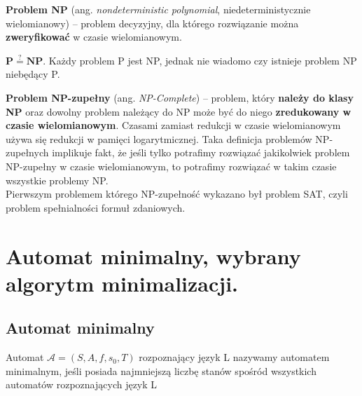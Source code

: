 \documentclass[12pt]{article}
\begin{document}
    \begin{definition}
        \textbf{Problem NP} (ang. \textit{nondeterministic polynomial}, niedeterministycznie wielomianowy) – problem
        decyzyjny, dla którego rozwiązanie można \textbf{zweryfikować} w czasie wielomianowym.
    \end{definition}

    \begin{theorem}
        $\mathbf{P \stackrel{?}{=} NP}$. Każdy problem P jest NP, jednak nie wiadomo czy istnieje problem NP niebędący P.
    \end{theorem}

    \begin{definition}
        \textbf{Problem NP-zupełny} (ang. \textit{NP-Complete}) – problem, który \textbf{należy do klasy NP} oraz dowolny
        problem należący do NP może być do niego \textbf{zredukowany w czasie wielomianowym}. Czasami zamiast redukcji w
        czasie wielomianowym używa się redukcji w pamięci logarytmicznej. Taka definicja problemów NP-zupełnych
        implikuje fakt, że jeśli tylko potrafimy rozwiązać jakikolwiek problem NP-zupełny w czasie wielomianowym,
        to potrafimy rozwiązać w takim czasie wszystkie problemy NP.\\

        Pierwszym problemem którego NP-zupełność wykazano był problem SAT, czyli problem spełnialności formuł zdaniowych.
    \end{definition}

    \newpage

    \section{Automat minimalny, wybrany algorytm minimalizacji.}
    \subsection{Automat minimalny}
    \begin{definition}
    Automat $\mathcal{A} = (S, A, f, s_{0}, T)$ rozpoznający język L nazywamy automatem minimalnym, jeśli posiada najmniejszą liczbę stanów spośród wszystkich automatów rozpoznających język L
    \end{definition}
    
\end{document}
